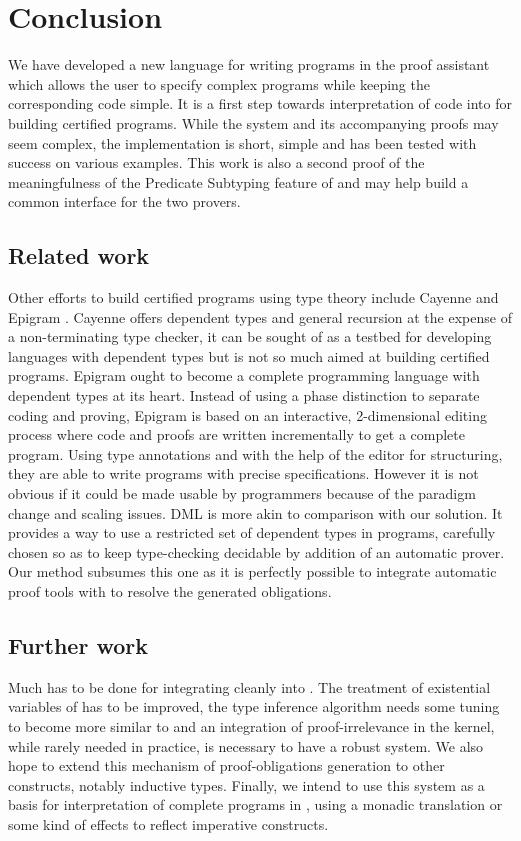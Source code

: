\documentclass{llncs}
\begin{document}
\section{Conclusion}
\label{sec:Conclusion}
We have developed a new language for writing programs in the \Coq proof
assistant which allows the user to specify complex programs while
keeping the corresponding code simple. It is a first step towards
interpretation of \ML code into \Coq for building certified
programs. While the system and its accompanying proofs may seem complex, the
implementation is short, simple and has been tested with success on
various examples. This work is also a second proof of the
meaningfulness of the Predicate Subtyping feature of \PVS{} and may
help build a common interface for the two provers. 

\subsection{Related work}
Other efforts to build certified programs using type theory include
Ca\-yenne \cite{Augustsson99} and Epigram
\cite{DBLP:journals/jfp/McBrideM04}. Cayenne offers dependent
types and general recursion at the expense of a non-terminating type
checker, it can be sought of as a testbed for developing languages with
dependent types but is not so much aimed at building certified programs.
Epigram ought to become a complete programming language with dependent
types at its heart. Instead of using a phase distinction to separate
coding and proving, Epigram is based on an interactive, 2-dimensional editing process
where code and proofs are written incrementally to get a complete program.
Using type annotations and with the help of the editor for structuring, 
they are able to write programs with precise specifications. However it
is not obvious if it could be made usable by programmers because of the
paradigm change and scaling issues. DML \cite{Xi98:PhD} is more akin to
comparison with our solution. It provides a way to use a restricted set
of dependent types in \ML programs, carefully chosen so as to keep
type-checking decidable by addition of an automatic prover. Our method
subsumes this one as it is perfectly possible to integrate automatic
proof tools with \Coq to resolve the generated obligations.

\subsection{Further work}
Much has to be done for integrating \Russell cleanly into \Coq. The
treatment of existential variables of \Coq has to be improved, the
type inference algorithm needs some tuning to become more similar to \ML
and an integration of proof-irrelevance in the kernel, while rarely needed in
practice, is necessary to have a robust system.
We also hope to extend this mechanism of proof-obligations generation to other
constructs, notably inductive types. Finally, we intend to use this system as a
basis for interpretation of complete \ML{} programs in \Coq, using a monadic
translation or some kind of effects to reflect imperative constructs.
\end{document}

